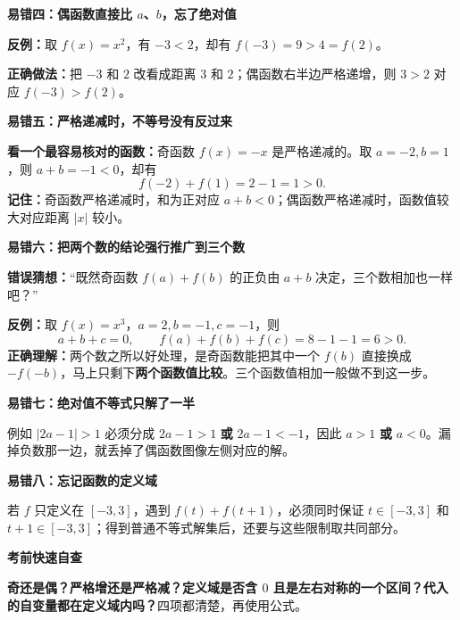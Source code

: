 \clearpage
\begin{trapbox}
\textbf{\textcolor{CTrap}{易错四：偶函数直接比 $a$、$b$，忘了绝对值}}



\textbf{反例：}取 $f(x)=x^2$，有 $-3<2$，却有 $f(-3)=9>4=f(2)$。

\textbf{正确做法：}把 $-3$ 和 $2$ 改看成距离 $3$ 和 $2$；偶函数右半边严格递增，则 $3>2$ 对应 $f(-3)>f(2)$。

\medskip

\end{trapbox}
\clearpage
\begin{trapbox}
\textbf{\textcolor{CTrap}{易错五：严格递减时，不等号没有反过来}}



\textbf{看一个最容易核对的函数：}奇函数 $f(x)=-x$ 是严格递减的。取 $a=-2,b=1$，则 $a+b=-1<0$，却有
\[
 f(-2)+f(1)=2-1=1>0.
\]
\textbf{记住：}奇函数严格递减时，和为正对应 $a+b<0$；偶函数严格递减时，函数值较大对应距离 $|x|$ 较小。

\medskip

\end{trapbox}
\clearpage
\begin{trapbox}
\textbf{\textcolor{CTrap}{易错六：把两个数的结论强行推广到三个数}}



\textbf{错误猜想：}“既然奇函数 $f(a)+f(b)$ 的正负由 $a+b$ 决定，三个数相加也一样吧？”

\textbf{反例：}取 $f(x)=x^3$，$a=2,b=-1,c=-1$，则
\[
 a+b+c=0,\qquad f(a)+f(b)+f(c)=8-1-1=6>0.
\]
\textbf{正确理解：}两个数之所以好处理，是奇函数能把其中一个 $f(b)$ 直接换成 $-f(-b)$，马上只剩下\textbf{两个函数值比较}。三个函数值相加一般做不到这一步。

\medskip

\end{trapbox}
\clearpage
\begin{trapbox}
\textbf{\textcolor{CTrap}{易错七：绝对值不等式只解了一半}}



例如 $|2a-1|>1$ 必须分成 $2a-1>1$ \textbf{或} $2a-1<-1$，因此 $a>1$ \textbf{或} $a<0$。漏掉负数那一边，就丢掉了偶函数图像左侧对应的解。

\medskip

\end{trapbox}
\clearpage
\begin{trapbox}
\textbf{\textcolor{CTrap}{易错八：忘记函数的定义域}}



若 $f$ 只定义在 $[-3,3]$，遇到 $f(t)+f(t+1)$，必须同时保证 $t\in[-3,3]$ 和 $t+1\in[-3,3]$；得到普通不等式解集后，还要与这些限制取共同部分。

\medskip
\textbf{\textcolor{CTrap}{考前快速自查}}

\textbf{奇还是偶？严格增还是严格减？定义域是否含 $0$ 且是左右对称的一个区间？代入的自变量都在定义域内吗？}四项都清楚，再使用公式。
\end{trapbox}
